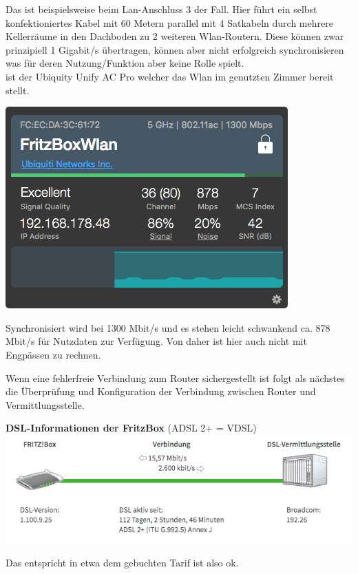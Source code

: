 Das ist beispielsweise beim Lan-Anschluss 3 der Fall. Hier führt ein selbst konfektioniertes Kabel mit 60 Metern parallel mit 4 Satkabeln durch mehrere Kellerräume in den Dachboden zu 2 weiteren Wlan-Routern. Diese können zwar prinzipiell 1 Gigabit/s übertragen, können aber nicht erfolgreich synchronisieren was für deren Nutzung/Funktion aber keine Rolle spielt. \\

 ist der Ubiquity Unify AC Pro welcher das Wlan im genutzten Zimmer bereit stellt.

\begin{center}
  \includegraphics[scale=0.5]{./pictures/wlanSynced.png}
\end{center}

Synchronisiert wird bei 1300 Mbit/s und es stehen leicht schwankend ca. 878 Mbit/s für Nutzdaten zur Verfügung.
Von daher ist hier auch nicht mit Engpässen zu rechnen.


\newpage
{}

Wenn eine fehlerfreie Verbindung zum Router sichergestellt ist folgt als nächstes die Überprüfung und Konfiguration der Verbindung zwischen Router und Vermittlungsstelle. \\

{\vspace{-0.1cm}}
\begin{center}
  \textbf{DSL-Informationen der FritzBox} (ADSL 2+ = VDSL)\\
  \includegraphics[scale=0.50]{./pictures/dslinfo.png}
\end{center}
Das entspricht in etwa dem gebuchten Tarif ist also ok.\\

